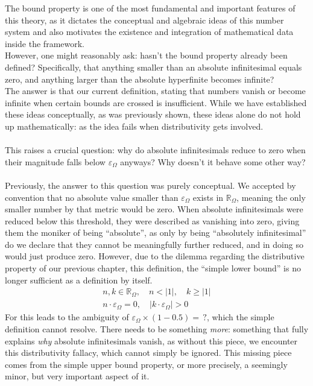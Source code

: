 \documentclass{article}
\begin{document}
The bound property is one of the most fundamental and important features of this theory, as it dictates the conceptual and algebraic ideas of this number system and also motivates the existence and integration of mathematical data inside the framework.\\However, one might reasonably ask: hasn't the bound property already been defined? Specifically, that anything smaller than an absolute infinitesimal equals zero, and anything larger than the absolute hyperfinite becomes infinite?\\The answer is that our current definition, stating that numbers vanish or become infinite when certain bounds are crossed is insufficient. While we have established these ideas conceptually, as was previously shown, these ideas alone do not hold up mathematically: as the idea fails when distributivity gets involved.
\\\\ This raises a crucial question: why do absolute infinitesimals reduce to zero when their magnitude falls below $\varepsilon_\Omega$ anyways? Why doesn't it behave some other way?
\\\\Previously, the answer to this question was purely conceptual. We accepted by convention that no absolute value smaller than $\varepsilon_\Omega$ exists in $\mathbb{R}_\Omega$, meaning the only smaller number by that metric would be zero. When absolute infinitesimals were reduced below this threshold, they were described as vanishing into zero, giving them the moniker of being ``absolute'', as only by being ``absolutely infinitesimal'' do we declare that they cannot be meaningfully further reduced, and in doing so would just produce zero. However, due to the dilemma regarding the distributive property of our previous chapter, this definition, the ``simple lower bound'' is no longer sufficient as a definition by itself.
\begin{gather*}
n, k \in \mathbb{R}_\Omega, \quad n < |1|, \quad k \geq |1| \\
n \cdot \varepsilon_\Omega = 0, \quad |k \cdot \varepsilon_\Omega| > 0
\end{gather*}
For this leads to the ambiguity of $\varepsilon_\Omega \times (1 - 0.5) = \, ?$, which the simple definition cannot resolve.
There needs to be something \textit{more}: something that fully explains \textit{why} absolute infinitesimals vanish, as without this piece, we encounter this distributivity fallacy, which cannot simply be ignored. This missing piece comes from the simple upper bound property, or more precisely, a seemingly minor, but very important aspect of it. 
\end{document}
